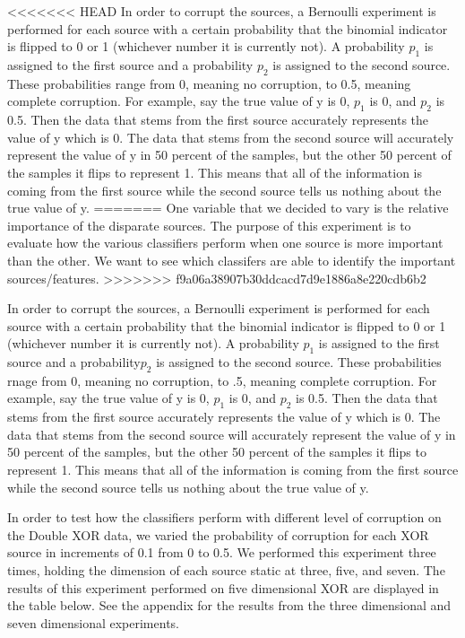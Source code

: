 \documentclass{article}
\begin{document}
<<<<<<< HEAD
In order to corrupt the sources, a Bernoulli experiment is performed for each
source with a certain probability that the binomial indicator is flipped to 0
or 1 (whichever number it is currently not). A probability $p_1$ is assigned to
the first source and a probability $p_2$ is assigned to the second source.
These probabilities range from 0, meaning no corruption, to 0.5, meaning
complete corruption. For example, say the true value of y is 0, $p_1$ is 0, and
$p_2$ is 0.5. Then the data that stems from the first source accurately
represents the value of y which is 0. The data that stems from the second
source will accurately represent the value of y in 50 percent of the samples,
but the other 50 percent of the samples it flips to represent 1. This means
that all of the information is coming from the first source while the second
source tells us nothing about the true value of y.
=======
One variable that we decided to vary is the relative importance of the disparate sources. The purpose of this experiment is to evaluate how the various classifiers perform when one source is more important than the other. We want to see which classifers are able to identify the important sources/features.
>>>>>>> f9a06a38907b30ddcacd7d9e1886a8e220cdb6b2

In order to corrupt the sources, a Bernoulli experiment is performed for each source with a certain probability that the binomial indicator is flipped to 0 or 1 (whichever number it is currently not). A probability $p_1$ is assigned to the first source and a probability$ p_2$ is assigned to the second source. These probabilities rnage from 0, meaning no corruption, to .5, meaning complete corruption. For example, say the true value of y is 0, $p_1$ is 0, and $p_2$ is 0.5. Then the data that stems from the first source accurately represents the value of y which is 0. The data that stems from the second source will accurately represent the value of y in 50 percent of the samples, but the other 50 percent of the samples it flips to represent 1. This means that all of the information is coming from the first source while the second source tells us nothing about the true value of y.

In order to test how the classifiers perform with different level of corruption on the Double XOR data, we varied the probability of corruption for each XOR source in increments of 0.1 from 0 to 0.5. We performed this experiment three times, holding the dimension of each source static at three, five, and seven. The results of this experiment performed on five dimensional XOR are displayed in the table below. See the appendix for the results from the three dimensional and seven dimensional experiments.
\end{document}
